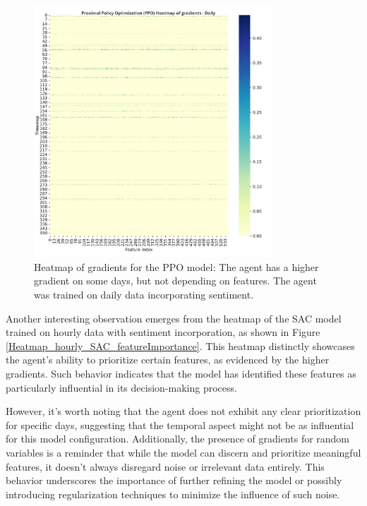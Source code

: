 \documentclass[12pt]{article}
\begin{document}
\begin{figure}[h]
    \centering
    \includegraphics[width=0.8\textwidth]{figs/Heatmap_daily_PPO_importantdays.jpg}
    \caption{Heatmap of gradients for the PPO model: The agent has a higher gradient on some days, but not depending on features. The agent was trained on daily data incorporating sentiment.}

    \label{fig:Heatmap_daily_PPO_importantdays}
\end{figure}

Another interesting observation emerges from the heatmap of the SAC model trained on hourly data with sentiment incorporation, as shown in Figure \ref{Heatmap_hourly_SAC_featureImportance}. This heatmap distinctly showcases the agent's ability to prioritize certain features, as evidenced by the higher gradients. Such behavior indicates that the model has identified these features as particularly influential in its decision-making process.

However, it's worth noting that the agent does not exhibit any clear prioritization for specific days, suggesting that the temporal aspect might not be as influential for this model configuration. Additionally, the presence of gradients for random variables is a reminder that while the model can discern and prioritize meaningful features, it doesn't always disregard noise or irrelevant data entirely. This behavior underscores the importance of further refining the model or possibly introducing regularization techniques to minimize the influence of such noise.
\end{document}
